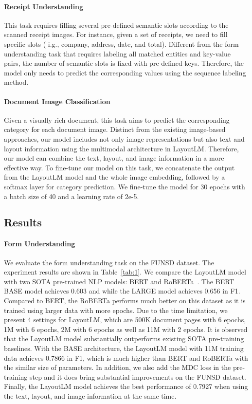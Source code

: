 \documentclass[sigconf]{acmart}
\begin{document}
\paragraph{Receipt Understanding}
This task requires filling several pre-defined semantic slots according to the scanned receipt images. For instance, given a set of receipts, we need to fill specific slots ( i.g., company, address, date, and total). Different from the form understanding task that requires labeling all matched entities and key-value pairs, the number of semantic slots is fixed with pre-defined keys. Therefore, the model only needs to predict the corresponding values using the sequence labeling method.

\paragraph{Document Image Classification}
Given a visually rich document, this task aims to predict the corresponding category for each document image. Distinct from the existing image-based approaches, our model includes not only image representations but also text and layout information using the multimodal architecture in LayoutLM. Therefore, our model can combine the text, layout, and image information in a more effective way. To fine-tune our model on this task, we concatenate the output from the LayoutLM model and the whole image embedding, followed by a softmax layer for category prediction. We fine-tune the model for 30 epochs with a batch size of 40 and a learning rate of 2e-5.

\subsection{Results}


\paragraph{Form Understanding}

We evaluate the form understanding task on the FUNSD dataset. The experiment results are shown in Table~\ref{tab:1}. We compare the LayoutLM model with two SOTA pre-trained NLP models: BERT and RoBERTa~\citep{Liu2019RoBERTaAR}. The BERT BASE model achieves 0.603 and while the LARGE model achieves 0.656 in F1. Compared to BERT, the RoBERTa performs much better on this dataset as it is trained using larger data with more epochs. Due to the time limitation, we present 4 settings for LayoutLM, which are 500K document pages with 6 epochs, 1M with 6 epochs, 2M with 6 epochs as well as 11M with 2 epochs. It is observed that the LayoutLM model substantially outperforms existing SOTA pre-training baselines. With the BASE architecture, the LayoutLM model with 11M training data achieves 0.7866 in F1, which is much higher than BERT and RoBERTa with the similar size of parameters. In addition, we also add the MDC loss in the pre-training step and it does bring substantial improvements on the FUNSD dataset. Finally, the LayoutLM model achieves the best performance of 0.7927 when using the text, layout, and image information at the same time.
\end{document}
